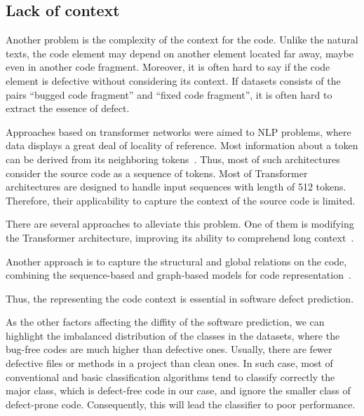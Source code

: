 \documentclass{article}
\begin{document}
\subsection{Lack of context}

Another problem is the complexity of the context for the code. Unlike the natural texts, the code element may depend on another element located far away, maybe even in another code fragment. Moreover, it is often hard to say if the code element is defective without considering its context. If datasets consists of the pairs ``bugged code fragment'' and ``fixed code fragment'', it is often hard to extract the essence of defect.

Approaches based on transformer networks were aimed to NLP problems, where data displays a great deal of locality of reference. Most information about a token can be derived from its neighboring tokens~\cite{ tay2020efficient,zaheer2021big}. Thus, most of such architectures consider the source code as a sequence of tokens.
 Most of Transformer architectures are designed to handle input sequences with length of 512 tokens. Therefore, their applicability to capture the context of the source code is limited.
 
 There are several approaches to alleviate this problem. One of them is modifying the Transformer architecture, improving its ability to comprehend long context~\cite{zaheer2021bigbird}. 
 
 Another approach is to capture the structural and global relations on the code, combining the sequence-based and graph-based models for code representation~\cite{hellendoorn2020global,guo2021graphcodebert}. 

Thus, the representing the code context is essential in software defect prediction. 


As the other factors affecting the diffity of the software prediction, we can highlight the imbalanced distribution of the classes in the datasets, where the bug-free codes are much higher than defective ones. Usually, there are fewer defective files or methods in a project than clean ones.
In such case, most of conventional and basic classification algorithms tend to classify correctly the major class,
which is defect-free code in our case, and ignore the smaller class of defect-prone code.
Consequently, this will lead the classifier to poor performance.
\end{document}
